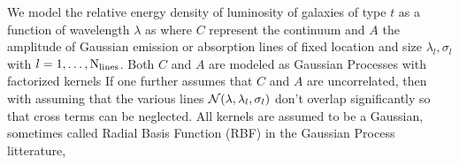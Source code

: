 \documentclass[aps,prd,showpacs,superscriptaddress,groupedaddress]{revtex4}  %
\begin{document}
We model the relative energy density of luminosity of galaxies of type $t$ as a function of wavelength $\lambda$ as
where $C$ represent the continuum and $A$ the amplitude of Gaussian emission or absorption lines of fixed location and size $ \lambda_l, \sigma_l$ with $l = 1, \ldots, {\rm N}_{\rm lines}$. Both $C$ and $A$ are modeled as Gaussian Processes with factorized kernels
If one further assumes that $C$ and $A$ are uncorrelated, then 
with 
assuming that the various lines $\mathcal{N}(\lambda, \lambda_l, \sigma_l)$ don't overlap significantly so that cross terms can be neglected. All kernels are assumed to be a Gaussian, sometimes called Radial Basis Function (RBF) in the Gaussian Process litterature,
\end{document}
